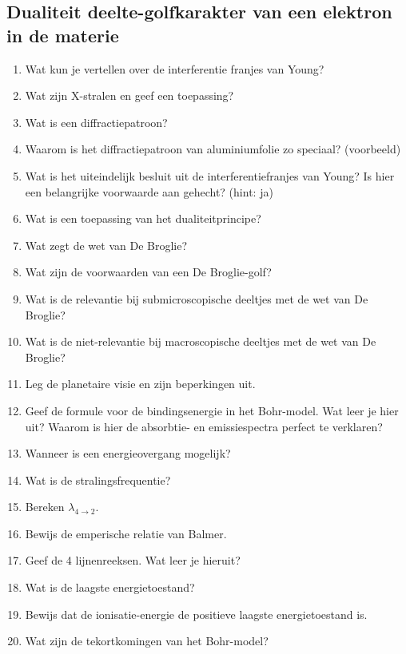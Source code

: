 \documentclass[a4paper,12pt]{article}
\begin{document}
    \subsection{Dualiteit deelte-golfkarakter van een elektron in de materie}
    \begin{enumerate}
        \item Wat kun je vertellen over de interferentie franjes van Young?
        \item Wat zijn X-stralen en geef een toepassing?
        \item Wat is een diffractiepatroon?
        \item Waarom is het diffractiepatroon van aluminiumfolie zo speciaal? (voorbeeld)
        \item Wat is het uiteindelijk besluit uit de interferentiefranjes van Young? Is hier een belangrijke voorwaarde aan gehecht? (hint: ja)
        \item Wat is een toepassing van het dualiteitprincipe?
        \item Wat zegt de wet van De Broglie?
        \item Wat zijn de voorwaarden van een De Broglie-golf?
        \item Wat is de relevantie bij submicroscopische deeltjes met de wet van De Broglie?
        \item Wat is de niet-relevantie bij macroscopische deeltjes met de wet van De Broglie?
        \item Leg de planetaire visie en zijn beperkingen uit.
        \item Geef de formule voor de bindingsenergie in het Bohr-model. Wat leer je hier uit? Waarom is hier de absorbtie- en emissiespectra perfect te verklaren?
        \item Wanneer is een energieovergang mogelijk?
        \item Wat is de stralingsfrequentie?
        \item Bereken $\lambda_{4 \rightarrow 2}$. 
        \item Bewijs de emperische relatie van Balmer.
        \item Geef de 4 lijnenreeksen. Wat leer je hieruit?
        \item Wat is de laagste energietoestand?
        \item Bewijs dat de ionisatie-energie de positieve laagste energietoestand is.
        \item Wat zijn de tekortkomingen van het Bohr-model?
    \end{enumerate}
\end{document}
